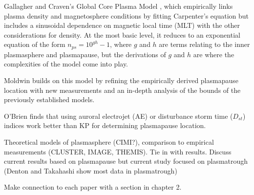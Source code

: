  Gallagher and Craven's Global Core Plasma Model \cite{Gallagher2000GlobalCore}, which empirically links plasma density and magnetosphere conditions by fitting Carpenter's equation but includes a sinusoidal dependence on magnetic local time (MLT) with the other considerations for density. At the most basic level, it reduces to an exponential equation of the form $n_{ps}=10^{gh}-1$, where $g$ and $h$ are terms relating to the inner plasmasphere and plasmapause, but the derivations of $g$ and $h$ are where the complexities of the model come into play.

Moldwin \cite{Moldwin2002ModelPlasmapause} builds on this model by refining the empirically derived plasmapause location with new measurements and an in-depth analysis of the bounds of the previously established models.

O'Brien \cite{OBrien2003EmpiricalPlasmapause} finds that using auroral electrojet (AE) or disturbance storm time ($D_{st}$) indices work better than KP for determining plasmapause location.


\vnote Theoretical models of plasmasphere (CIMI?), comparison to empirical measurements (CLUSTER, IMAGE, THEMIS). Tie in with results. Discuss current results based on plasmapause but current study focused on plasmatrough (Denton and Takahashi show most data in plasmatrough)

\note Make connection to each paper with a section in chapter 2.

